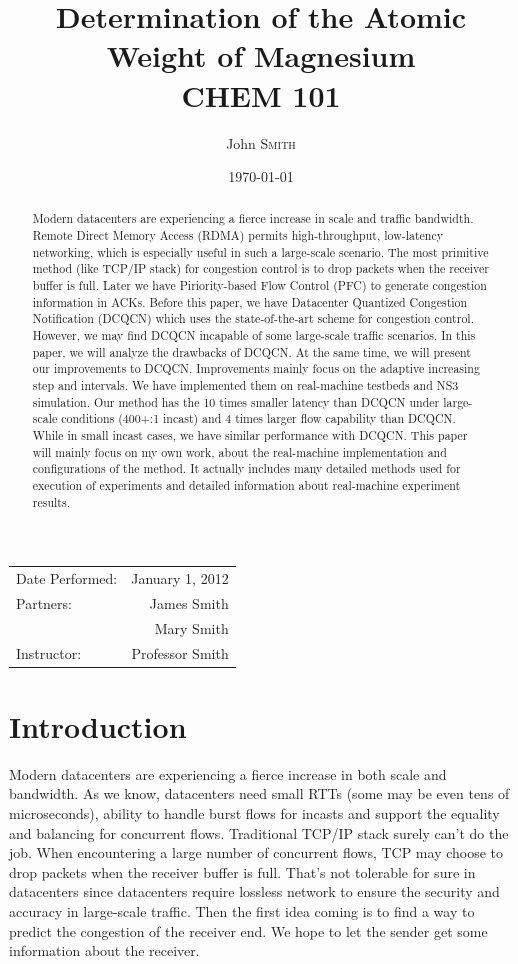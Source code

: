 \documentclass{article}
\title{Determination of the Atomic \\ Weight of Magnesium \\ CHEM 101} %
\author{John \textsc{Smith}} %
\date{\today} %
\begin{document}
\maketitle %

\begin{center}
\begin{tabular}{l r}
Date Performed: & January 1, 2012 \\ %
Partners: & James Smith \\ %
& Mary Smith \\
Instructor: & Professor Smith %
\end{tabular}
\end{center}


\begin{abstract}
	Modern datacenters are experiencing a fierce increase in scale and traffic bandwidth.
	Remote Direct Memory Access (RDMA) permits high-throughput, low-latency networking,
	which is especially useful in such a large-scale scenario.
	The most primitive method (like TCP/IP stack) for congestion control is to drop packets when the receiver buffer is full.
	Later we have Piriority-based Flow Control (PFC) to generate congestion information in ACKs.
	Before this paper, we have Datacenter Quantized Congestion Notification (DCQCN) which uses the state-of-the-art scheme for congestion control.
	However, we may find DCQCN incapable of some large-scale traffic scenarios.
	In this paper, we will analyze the drawbacks of DCQCN.
	At the same time, we will present our improvements to DCQCN.
	Improvements mainly focus on the adaptive increasing step and intervals.
	We have implemented them on real-machine testbeds and NS3 simulation.
	Our method has the 10 times smaller latency than DCQCN under large-scale conditions (400+:1 incast) and 4 times larger flow capability than DCQCN.
	While in small incast cases, we have similar performance with DCQCN.
	This paper will mainly focus on my own work, about the real-machine implementation and configurations of the method.
	It actually includes many detailed methods used for execution of experiments and detailed information about real-machine experiment results.
\end{abstract}


\section{Introduction}
Modern datacenters are experiencing a fierce increase in both scale and bandwidth.
As we know, datacenters need small RTTs (some may be even tens of microseconds),
ability to handle burst flows for incasts and support the equality and balancing for concurrent flows.
Traditional TCP/IP stack surely can't do the job.
When encountering a large number of concurrent flows, TCP may choose to drop packets when the receiver buffer is full.
That's not tolerable for sure in datacenters since datacenters require lossless network to ensure the security and accuracy in large-scale traffic.
Then the first idea coming is to find a way to predict the congestion of the receiver end.
We hope to let the sender get some information about the receiver.
\end{document}
